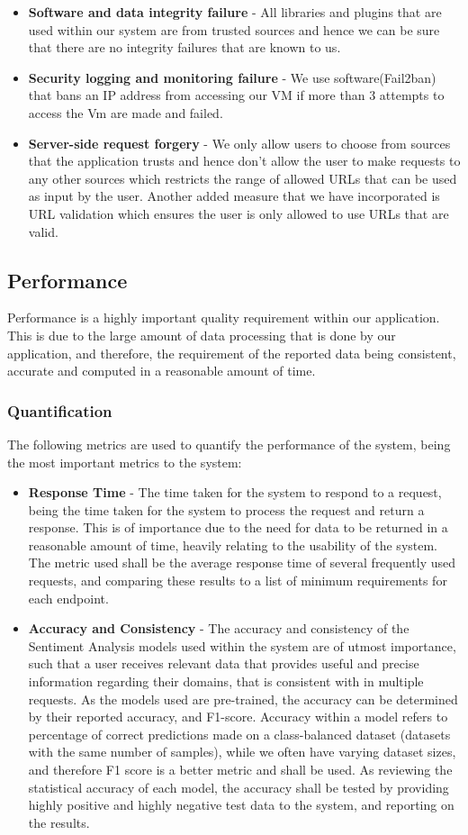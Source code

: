 \documentclass[12pt]{article}
\begin{document}
\begin{itemize}
    \item \textbf{Software and data integrity failure} - All libraries and plugins that are used within our system are from trusted sources and hence we can be sure that there are no integrity failures that are known to us.
    \item \textbf{Security logging and monitoring failure} - We use software(Fail2ban) that bans an IP address from accessing our VM if more than 3 attempts to access the Vm are made and failed.
    \item \textbf{Server-side request forgery} - We only allow users to choose from sources that the application trusts and hence don't allow the user to make requests to any other sources which restricts the range of allowed URLs that can be used as input by the user. Another added measure that we have incorporated is URL validation which ensures the user is only allowed to use URLs that are valid.
\end{itemize}
\newpage
\subsection{Performance}
Performance is a highly important quality requirement within our application. This is due to the large amount of data processing that is done by our application, and therefore, the requirement of the reported data being consistent, accurate and computed in a reasonable amount of time.
\subsubsection{Quantification}
The following metrics are used to quantify the performance of the system, being the most important metrics to the system:
\begin{itemize}
    \item \textbf{Response Time} - The time taken for the system to respond to a request, being the time taken for the system to process the request and return a response. This is of importance due to the need for data to be returned in a reasonable amount of time, heavily relating to the usability of the system.
          The metric used shall be the average response time of several frequently used requests, and comparing these results to a list of minimum requirements for each endpoint.
    \item \textbf{Accuracy and Consistency} - The accuracy and consistency of the Sentiment Analysis models used within the system are of utmost importance, such that a user receives relevant data that provides useful and precise information regarding their domains, that is consistent with in multiple requests.
          As the models used are pre-trained, the accuracy can be determined by their reported accuracy, and F1-score. Accuracy within a model refers to percentage of correct predictions made on a class-balanced dataset (datasets with the same number of samples), while we often have varying dataset sizes, and therefore F1 score is a better metric and shall be used. As reviewing the statistical accuracy of each model, the accuracy shall be tested by providing highly positive and highly negative test data to the system, and reporting on the results.
\end{itemize}
\end{document}
